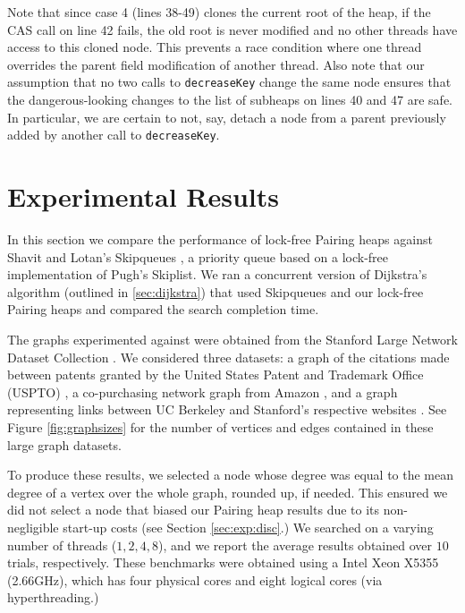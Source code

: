 \documentclass{acm_proc_article-sp}
\begin{document}
Note that since case 4 (lines 38-49) clones the current root of the heap, if the CAS
call on line 42 fails, the old root is never modified and no other threads
have access to this cloned node. This prevents a race condition where one
thread overrides the parent field modification of another thread. Also
note that our assumption that no two calls to \texttt{decreaseKey} change
the same node ensures that the dangerous-looking changes to the
list of subheaps on lines 40 and 47 are safe. In particular, we are
certain to not, say, detach a node from a parent previously added by
another call to \texttt{decreaseKey}.



\section{Experimental Results}
\label{sec:exp}
In this section we compare the performance of lock-free Pairing heaps against
Shavit and Lotan's Skipqueues \cite{shavit00}, a priority queue based
on a lock-free implementation of Pugh's \cite{pugh90a} Skiplist.
We ran a concurrent version of Dijkstra's algorithm (outlined in 
\ref{sec:dijkstra}) that used Skipqueues and our lock-free Pairing heaps
and compared the search completion time.

The graphs experimented against were obtained from 
the Stanford Large Network Dataset Collection \cite{slndc}.
We considered three datasets: a graph of the citations made
between patents granted by the United States Patent and Trademark
Office (USPTO) \cite{leskovec05}, a co-purchasing network graph from Amazon \cite{leskovec07},
and a graph representing links between UC Berkeley and Stanford's respective websites \cite{leskovec09}.
See Figure \ref{fig:graphsizes} for the number of vertices and
edges contained in these large graph datasets.

To produce these results, we selected a node whose degree
was equal to the mean degree of a vertex over the whole graph,
rounded up, if needed. This ensured we did not select a node
that biased our Pairing heap results due to its non-negligible 
start-up costs (see Section \ref{sec:exp:disc}.) 
We searched on a varying number of threads ($1,2,4,8$), and
we report the average results obtained over $10$ trials, respectively. 
These benchmarks were obtained using a Intel Xeon X5355 (2.66GHz),
which has four physical cores and eight logical cores (via hyperthreading.)
\end{document}
